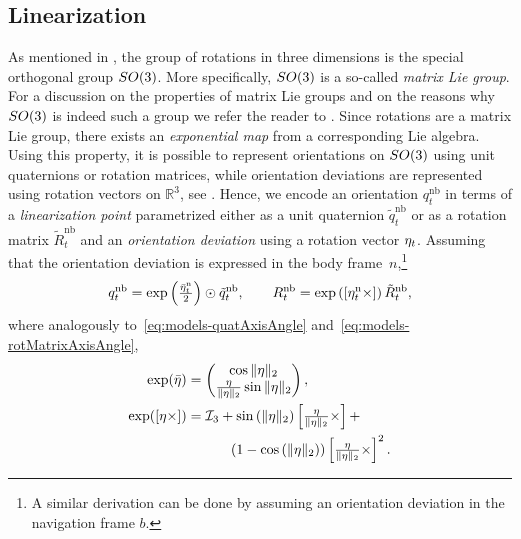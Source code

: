 \subsection{Linearization}
\label{sec:models-linearization}
As mentioned in , the group of rotations in three dimensions is the special orthogonal group $SO(3)$. More specifically, $SO(3)$ is a so-called \emph{matrix Lie group}. For a discussion on the properties of matrix Lie groups and on the reasons why $SO(3)$ is indeed such a group we refer the reader to \eg \cite{barfoot:2016}. Since rotations are a matrix Lie group, there exists an \emph{exponential map} from a corresponding Lie algebra. Using this property, it is possible to represent orientations on $SO(3)$ using unit quaternions or rotation matrices, while orientation deviations are represented using rotation vectors on $\mathbb{R}^3$, see \eg \cite{bloeschEtAl:2016}. Hence, we encode an orientation $q^\text{nb}_t$ in terms of a \emph{linearization point} parametrized either as a unit quaternion $\tilde{q}^\text{nb}_t$ or as a rotation matrix $\tilde{R}^\text{nb}_t$ and an \emph{orientation deviation} using a rotation vector $\eta_t$. Assuming that the orientation deviation is expressed in the body frame~$n$,\footnote{A similar derivation can be done by assuming an orientation deviation in the navigation frame $b$.}
	\begin{align}
	\label{eq:models-oriDev}
	q^\text{nb}_t = \exp \left( \tfrac{\bar {\eta}_t^\text{n}}{2} \right) \odot \tilde{q}^\text{nb}_t, \qquad
	R^\text{nb}_t = \exp \left( [\eta_t^\text{n} \times] \right) \tilde{R}^\text{nb}_t,
	\end{align}
where analogously to~\eqref{eq:models-quatAxisAngle} and~\eqref{eq:models-rotMatrixAxisAngle}, 
\begin{subequations}
\begin{align}
\exp (\bar {\eta}) &= \begin{pmatrix} \cos \| \eta \|_2 \\ \tfrac{\eta}{\| \eta \|_2} \sin \| \eta \|_2 \end{pmatrix}, \\
\exp ([\eta \times]) &= \mathcal{I}_3 + \sin\left( \| \eta \|_2 \right) \left[ \tfrac{\eta}{\| \eta \|_2} \times \right] + \nonumber \\
& \qquad \quad \left(1-\cos \left( \| \eta \|_2\right) \right) \left[ \tfrac{\eta}{\| \eta \|_2} \times \right]^2.
\label{eq:models-expqR}
\end{align}
\end{subequations}
